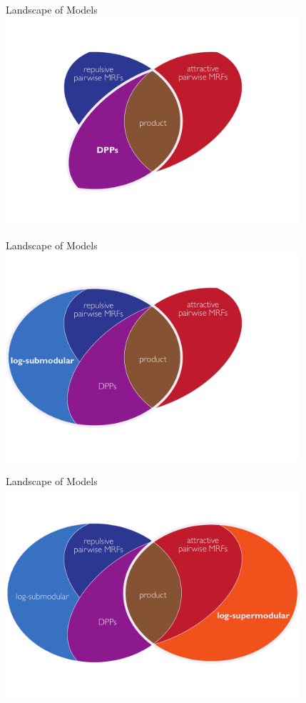 \begin{frame}{Landscape of Models}
\vspace{0.5em}
\centering
\includegraphics[width=4.3in]{figures/venn04.pdf}
\end{frame}

\begin{frame}{Landscape of Models}
\vspace{0.5em}
\centering
\includegraphics[width=4.3in]{figures/venn06.pdf}
\end{frame}

\begin{frame}{Landscape of Models}
\vspace{0.5em}
\centering
\includegraphics[width=4.3in]{figures/venn07.pdf}
\end{frame}

